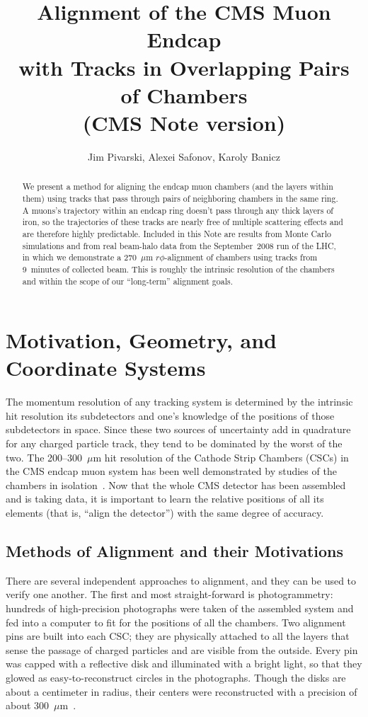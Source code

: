 \documentclass[12pt]{article}
\title{Alignment of the CMS Muon Endcap \\ with Tracks in Overlapping
  Pairs of Chambers \\ (CMS Note version)}
\author{Jim Pivarski, Alexei Safonov, Karoly Banicz}
\begin{document}
\maketitle

\begin{abstract}
We present a method for aligning the endcap muon chambers (and the
layers within them) using tracks that pass through pairs of
neighboring chambers in the same ring.  A muons's trajectory within an
endcap ring doesn't pass through any thick layers of iron, so the
trajectories of these tracks are nearly free of multiple scattering
effects and are therefore highly predictable.  Included in this Note
are results from Monte Carlo simulations and from real beam-halo data
from the September~2008 run of the LHC, in which we demonstrate a
270~$\mu$m $r\phi$-alignment of chambers using tracks from 9~minutes of
collected beam.  This is roughly the intrinsic resolution of the
chambers and within the scope of our ``long-term'' alignment goals.

\end{abstract}

\section{Motivation, Geometry, and Coordinate Systems}

The momentum resolution of any tracking system is determined by the
intrinsic hit resolution its subdetectors and one's knowledge of the
positions of those subdetectors in space.  Since these two sources of
uncertainty add in quadrature for any charged particle track, they
tend to be dominated by the worst of the two.  The 200--300~$\mu$m hit
resolution of the Cathode Strip Chambers (CSCs) in the CMS endcap muon
system has been well demonstrated by studies of the chambers in
isolation~\cite{intrinsic_resolution}.  Now that the whole CMS
detector has been assembled and is taking data, it is important to
learn the relative positions of all its elements (that is, ``align the
detector'') with the same degree of accuracy.

\subsection{Methods of Alignment and their Motivations}

There are several independent approaches to alignment, and they can be
used to verify one another.  The first and most straight-forward is
photogrammetry: hundreds of high-precision photographs were taken of
the assembled system and fed into a computer to fit for the positions
of all the chambers.  Two alignment pins are built into each CSC; they
are physically attached to all the layers that sense the passage of
charged particles and are visible from the outside.  Every pin was
capped with a reflective disk and illuminated with a bright light, so
that they glowed as easy-to-reconstruct circles in the photographs.
Though the disks are about a centimeter in radius, their centers were
reconstructed with a precision of about
300~$\mu$m~\cite{photogrammetry}.
\end{document}
